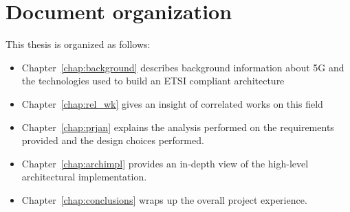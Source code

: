 \section*{Document organization}
 
This thesis is organized as follows:
\begin{itemize}
 \item Chapter~\ref{chap:background} describes background information about 5G 
and the technologies used to build an ETSI compliant architecture
 \item Chapter~\ref{chap:rel_wk} gives an insight of correlated works on this 
field
 \item Chapter~\ref{chap:prjan} explains the analysis performed on the 
requirements provided and the design choices performed.
 \item Chapter~\ref{chap:archimpl} provides an in-depth view of the 
high-level architectural implementation.
 \item Chapter~\ref{chap:conclusions} wraps up the overall project experience.
\end{itemize}
